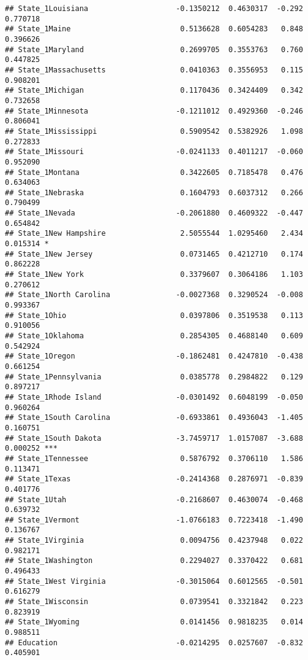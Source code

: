 \documentclass[
]{article}
\begin{document}
\begin{verbatim}
## State_1Louisiana                    -0.1350212  0.4630317  -0.292 0.770718    
## State_1Maine                         0.5136628  0.6054283   0.848 0.396626    
## State_1Maryland                      0.2699705  0.3553763   0.760 0.447825    
## State_1Massachusetts                 0.0410363  0.3556953   0.115 0.908201    
## State_1Michigan                      0.1170436  0.3424409   0.342 0.732658    
## State_1Minnesota                    -0.1211012  0.4929360  -0.246 0.806041    
## State_1Mississippi                   0.5909542  0.5382926   1.098 0.272833    
## State_1Missouri                     -0.0241133  0.4011217  -0.060 0.952090    
## State_1Montana                       0.3422605  0.7185478   0.476 0.634063    
## State_1Nebraska                      0.1604793  0.6037312   0.266 0.790499    
## State_1Nevada                       -0.2061880  0.4609322  -0.447 0.654842    
## State_1New Hampshire                 2.5055544  1.0295460   2.434 0.015314 *  
## State_1New Jersey                    0.0731465  0.4212710   0.174 0.862228    
## State_1New York                      0.3379607  0.3064186   1.103 0.270612    
## State_1North Carolina               -0.0027368  0.3290524  -0.008 0.993367    
## State_1Ohio                          0.0397806  0.3519538   0.113 0.910056    
## State_1Oklahoma                      0.2854305  0.4688140   0.609 0.542924    
## State_1Oregon                       -0.1862481  0.4247810  -0.438 0.661254    
## State_1Pennsylvania                  0.0385778  0.2984822   0.129 0.897217    
## State_1Rhode Island                 -0.0301492  0.6048199  -0.050 0.960264    
## State_1South Carolina               -0.6933861  0.4936043  -1.405 0.160751    
## State_1South Dakota                 -3.7459717  1.0157087  -3.688 0.000252 ***
## State_1Tennessee                     0.5876792  0.3706110   1.586 0.113471    
## State_1Texas                        -0.2414368  0.2876971  -0.839 0.401776    
## State_1Utah                         -0.2168607  0.4630074  -0.468 0.639732    
## State_1Vermont                      -1.0766183  0.7223418  -1.490 0.136767    
## State_1Virginia                      0.0094756  0.4237948   0.022 0.982171    
## State_1Washington                    0.2294027  0.3370422   0.681 0.496433    
## State_1West Virginia                -0.3015064  0.6012565  -0.501 0.616279    
## State_1Wisconsin                     0.0739541  0.3321842   0.223 0.823919    
## State_1Wyoming                       0.0141456  0.9818235   0.014 0.988511    
## Education                           -0.0214295  0.0257607  -0.832 0.405901    

\end{verbatim}
\end{document}
